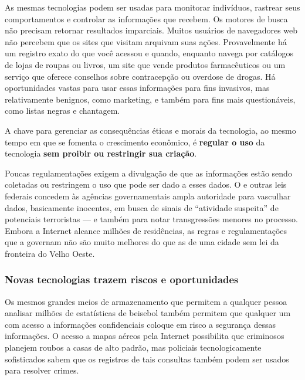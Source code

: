 As mesmas tecnologias podem ser usadas para monitorar indivíduos, rastrear seus
comportamentos e controlar as informações que recebem. Os motores de busca não
precisam retornar resultados imparciais. Muitos usuários de navegadores web não
percebem que os sites que visitam arquivam suas ações. Provavelmente há um
registro exato do que você acessou e quando, enquanto navega por catálogos de
lojas de roupas ou livros, um site que vende produtos farmacêuticos ou um
serviço que oferece conselhos sobre contracepção ou overdose de drogas. Há
oportunidades vastas para usar essas informações para fins invasivos, mas
relativamente benignos, como marketing, e também para fins mais questionáveis,
como listas negras e chantagem.

A chave para gerenciar as consequências éticas e morais da tecnologia, ao mesmo
tempo em que se fomenta o crescimento econômico, é \textbf{regular o uso} da
tecnologia \textbf{sem proibir ou restringir sua criação}.

Poucas regulamentações exigem a divulgação de que as informações estão sendo
coletadas ou restringem o uso que pode ser dado a esses dados. O  e outras leis federais concedem às agências governamentais ampla
autoridade para vasculhar dados, basicamente inocentes, em busca de sinais de
``atividade suspeita'' de potenciais terroristas --- e também para notar
transgressões menores no processo. Embora a Internet alcance milhões de
residências, as regras e regulamentações que a governam não são muito melhores
do que as de uma cidade sem lei da fronteira do Velho Oeste.

\subsubsection*{Novas tecnologias trazem riscos e oportunidades}
\label{cap1:exp-dig-perigo:risco}
Os mesmos grandes meios de armazenamento que permitem a qualquer pessoa analisar
milhões de estatísticas de beisebol também permitem que qualquer um com acesso a
informações confidenciais coloque em risco a segurança dessas informações. O
acesso a mapas aéreos pela Internet possibilita que criminosos planejem roubos a
casas de alto padrão, mas policiais tecnologicamente sofisticados sabem que os
registros de tais consultas também podem ser usados para resolver crimes.

